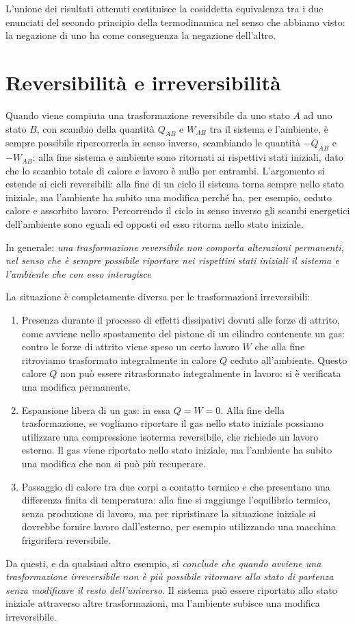 \documentclass[class=book, crop=false, oneside, 12pt]{standalone}
\begin{document}
L'unione dei risultati ottenuti costituisce la cosiddetta equivalenza tra i due enunciati del secondo principio della termodinamica nel senso che abbiamo visto: la negazione di uno ha come conseguenza la negazione dell'altro.

\section{Reversibilità e irreversibilità}

Quando viene compiuta una trasformazione reversibile da uno stato \(A\) ad uno stato \(B\), con scambio della quantità \(Q_{AB}\) e \(W_{AB}\) tra il sistema e l'ambiente, è sempre possibile ripercorrerla in senso inverso, scambiando le quantità \(-Q_{AB}\) e \(-W_{AB}\): alla fine sistema e ambiente sono ritornati ai rispettivi stati iniziali, dato che lo scambio totale di calore e lavoro è nullo per entrambi. 
L'argomento si estende ai cicli reversibili: alla fine di un ciclo il sistema torna sempre nello stato iniziale, ma l'ambiente ha subito una modifica perché ha, per esempio, ceduto calore e assorbito lavoro. 
Percorrendo il ciclo in senso inverso gli scambi energetici dell'ambiente sono eguali ed opposti ed esso ritorna nello stato iniziale.

In generale: \emph{una trasformazione reversibile non comporta alterazioni permanenti, nel senso che è sempre possibile riportare nei rispettivi stati iniziali il sistema e l'ambiente che con esso interagisce}

La situazione è completamente diversa per le trasformazioni irreversibili:
\begin{enumerate}
    \item Presenza durante il processo di effetti dissipativi dovuti alle forze di attrito, come avviene nello spostamento del pistone di un cilindro contenente un gas: contro le forze di attrito viene speso un certo lavoro \(W\) che alla fine ritroviamo trasformato integralmente in calore \(Q\) ceduto all'ambiente. 
    Questo calore \(Q\) non può essere ritrasformato integralmente in lavoro: si è verificata una modifica permanente. 
    \item Espansione libera di un gas: in essa \(Q = W = 0\). 
    Alla fine della trasformazione, se vogliamo riportare il gas nello stato iniziale possiamo utilizzare una compressione isoterma reversibile, che richiede un lavoro esterno. 
    Il gas viene riportato nello stato iniziale, ma l'ambiente ha subito una modifica che non si può più recuperare. 
    \item Passaggio di calore tra due corpi a contatto termico e che presentano una differenza finita di temperatura: alla fine si raggiunge l'equilibrio termico, senza produzione di lavoro, ma per ripristinare la situazione iniziale si dovrebbe fornire lavoro dall'esterno, per esempio utilizzando una macchina frigorifera reversibile.
\end{enumerate}
Da questi, e da qualsiasi altro esempio, si \emph{conclude che quando avviene una trasformazione irreversibile non è più possibile ritornare allo stato di partenza senza modificare il resto dell'universo}. 
Il sistema può essere riportato allo stato iniziale attraverso altre trasformazioni, ma l'ambiente subisce una modifica irreversibile.
\end{document}
